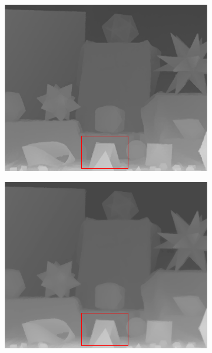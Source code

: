 \documentclass[preprint,10pt,5p,times,twocolumn]{elsarticle}
\begin{document}
\begin{figure}[t]
\begin{center}
\vspace{-0.3cm}
\begin{subfigure}[b]{0.136\linewidth}
    \includegraphics[width=\linewidth]{cmp_moebius_8X_JG.png}
    \label{fig:}
\end{subfigure}
\begin{subfigure}[b]{0.136\linewidth}
    \includegraphics[width=\linewidth]{cmp_moebius_8X_NLA.png}
    \label{fig:} %
\end{subfigure}

\end{center}
\end{figure}
\end{document}
